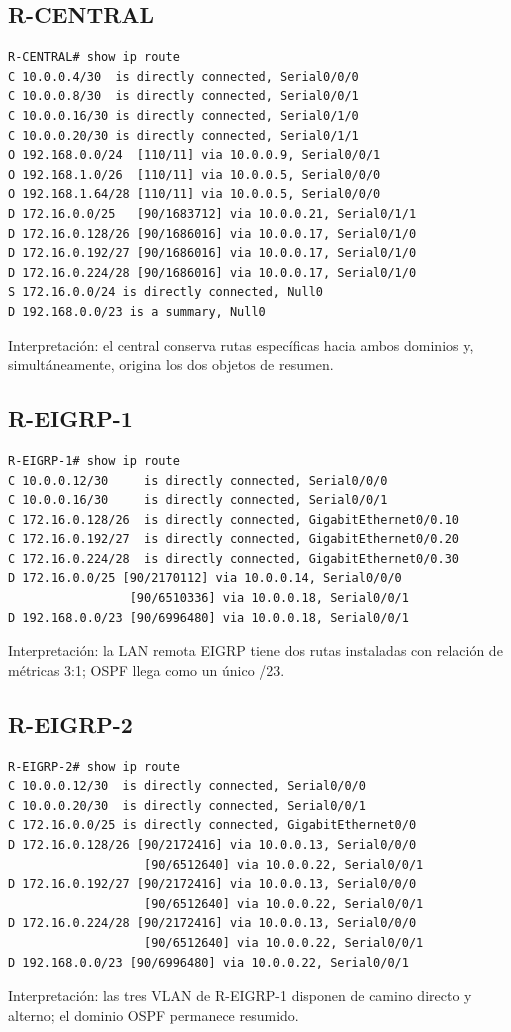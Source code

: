 \documentclass[10pt]{article}
\begin{document}
\subsection{R-CENTRAL}
\begin{verbatim}
R-CENTRAL# show ip route
C 10.0.0.4/30  is directly connected, Serial0/0/0
C 10.0.0.8/30  is directly connected, Serial0/0/1
C 10.0.0.16/30 is directly connected, Serial0/1/0
C 10.0.0.20/30 is directly connected, Serial0/1/1
O 192.168.0.0/24  [110/11] via 10.0.0.9, Serial0/0/1
O 192.168.1.0/26  [110/11] via 10.0.0.5, Serial0/0/0
O 192.168.1.64/28 [110/11] via 10.0.0.5, Serial0/0/0
D 172.16.0.0/25   [90/1683712] via 10.0.0.21, Serial0/1/1
D 172.16.0.128/26 [90/1686016] via 10.0.0.17, Serial0/1/0
D 172.16.0.192/27 [90/1686016] via 10.0.0.17, Serial0/1/0
D 172.16.0.224/28 [90/1686016] via 10.0.0.17, Serial0/1/0
S 172.16.0.0/24 is directly connected, Null0
D 192.168.0.0/23 is a summary, Null0
\end{verbatim}
Interpretación: el central conserva rutas específicas hacia ambos dominios y, simultáneamente, origina los dos objetos de resumen.

\subsection{R-EIGRP-1}
\begin{verbatim}
R-EIGRP-1# show ip route
C 10.0.0.12/30     is directly connected, Serial0/0/0
C 10.0.0.16/30     is directly connected, Serial0/0/1
C 172.16.0.128/26  is directly connected, GigabitEthernet0/0.10
C 172.16.0.192/27  is directly connected, GigabitEthernet0/0.20
C 172.16.0.224/28  is directly connected, GigabitEthernet0/0.30
D 172.16.0.0/25 [90/2170112] via 10.0.0.14, Serial0/0/0
                 [90/6510336] via 10.0.0.18, Serial0/0/1
D 192.168.0.0/23 [90/6996480] via 10.0.0.18, Serial0/0/1
\end{verbatim}
Interpretación: la LAN remota EIGRP tiene dos rutas instaladas con relación de métricas 3:1; OSPF llega como un único /23.

\subsection{R-EIGRP-2}
\begin{verbatim}
R-EIGRP-2# show ip route
C 10.0.0.12/30  is directly connected, Serial0/0/0
C 10.0.0.20/30  is directly connected, Serial0/0/1
C 172.16.0.0/25 is directly connected, GigabitEthernet0/0
D 172.16.0.128/26 [90/2172416] via 10.0.0.13, Serial0/0/0
                   [90/6512640] via 10.0.0.22, Serial0/0/1
D 172.16.0.192/27 [90/2172416] via 10.0.0.13, Serial0/0/0
                   [90/6512640] via 10.0.0.22, Serial0/0/1
D 172.16.0.224/28 [90/2172416] via 10.0.0.13, Serial0/0/0
                   [90/6512640] via 10.0.0.22, Serial0/0/1
D 192.168.0.0/23 [90/6996480] via 10.0.0.22, Serial0/0/1
\end{verbatim}
Interpretación: las tres VLAN de R-EIGRP-1 disponen de camino directo y alterno; el dominio OSPF permanece resumido.
\end{document}
